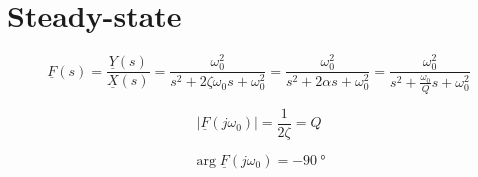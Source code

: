 \documentclass{article}[11pt]
\begin{document}
\section{Steady-state}

\begin{equation}
\underline{F}(s) = \frac{\underline{Y}(s)}{\underline{X}(s)} 
                 = \frac{\omega_0^2}{s^2 + 2 \zeta \omega_0 s + \omega_0^2 }
                 = \frac{\omega_0^2}{s^2 + 2 \alpha s + \omega_0^2 }
                 = \frac{\omega_0^2}{s^2 + \frac{\omega_0}{Q} s + \omega_0^2 }
\end{equation}

\begin{equation}
\left|\underline{F}(j\omega_0)\right| = \frac{1}{2 \zeta} = Q
\end{equation}

\begin{equation}
\arg{\underline{F}(j\omega_0)} = -\SI{90}{\degree}
\end{equation}
\end{document}
